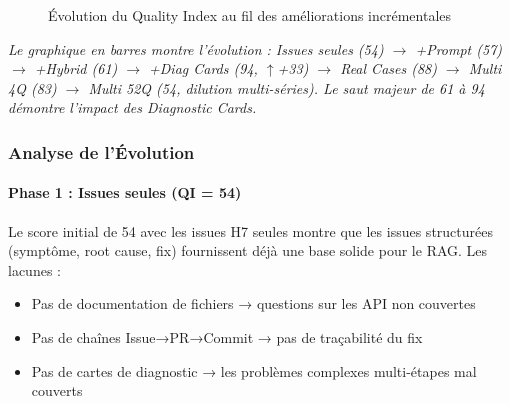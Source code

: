 \begin{figure}[H]
\centering
{}
\caption{Évolution du Quality Index au fil des améliorations incrémentales}
\label{fig:qi_config_evolution}
\end{figure}

\textit{Le graphique en barres montre l'évolution : Issues seules (54) $\to$ +Prompt (57) $\to$ +Hybrid (61) $\to$ +Diag Cards (94, $\uparrow$+33) $\to$ Real Cases (88) $\to$ Multi 4Q (83) $\to$ Multi 52Q (54, dilution multi-séries). Le saut majeur de 61 à 94 démontre l'impact des Diagnostic Cards.}

\subsubsection{Analyse de l'Évolution}

\paragraph{Phase 1 : Issues seules (QI = 54)}

Le score initial de 54 avec les issues H7 seules montre que les issues structurées (symptôme, root cause, fix) fournissent déjà une base solide pour le RAG. Les lacunes :
\begin{itemize}
  \item Pas de documentation de fichiers → questions sur les API non couvertes
  \item Pas de chaînes Issue→PR→Commit → pas de traçabilité du fix
  \item Pas de cartes de diagnostic → les problèmes complexes multi-étapes mal couverts
\end{itemize}

